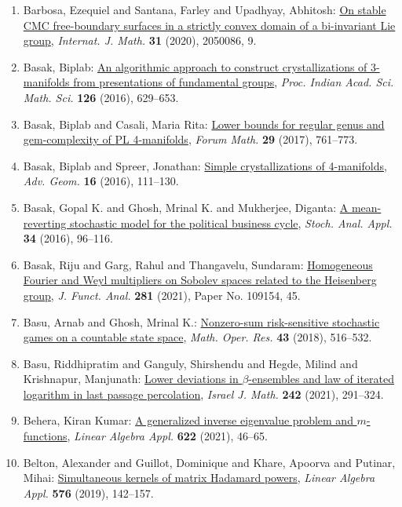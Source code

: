 \begin{enumerate}
\item Barbosa, Ezequiel and Santana, Farley and Upadhyay, Abhitosh: \href{https://doi.org/10.1142/S0129167X2050086X}{On stable {CMC} free-boundary surfaces in a strictly convex
domain of a bi-invariant {L}ie group}, \emph{Internat. J. Math.} {\bf 31} (2020), 2050086, 9.
\item Basak, Biplab: \href{https://doi.org/10.1007/s12044-016-0302-7}{An algorithmic approach to construct crystallizations of
3-manifolds from presentations of fundamental groups}, \emph{Proc. Indian Acad. Sci. Math. Sci.} {\bf 126} (2016), 629--653.
\item Basak, Biplab and Casali, Maria Rita: \href{https://doi.org/10.1515/forum-2015-0080}{Lower bounds for regular genus and gem-complexity of {PL}
4-manifolds}, \emph{Forum Math.} {\bf 29} (2017), 761--773.
\item Basak, Biplab and Spreer, Jonathan: \href{https://doi.org/10.1515/advgeom-2015-0043}{Simple crystallizations of 4-manifolds}, \emph{Adv. Geom.} {\bf 16} (2016), 111--130.
\item Basak, Gopal K. and Ghosh, Mrinal K. and Mukherjee, Diganta: \href{https://doi.org/10.1080/07362994.2015.1106321}{A mean-reverting stochastic model for the political business
cycle}, \emph{Stoch. Anal. Appl.} {\bf 34} (2016), 96--116.
\item Basak, Riju and Garg, Rahul and Thangavelu, Sundaram: \href{https://doi.org/10.1016/j.jfa.2021.109154}{Homogeneous {F}ourier and {W}eyl multipliers on {S}obolev
spaces related to the {H}eisenberg group}, \emph{J. Funct. Anal.} {\bf 281} (2021), Paper No. 109154, 45.
\item Basu, Arnab and Ghosh, Mrinal K.: \href{https://doi.org/10.1287/moor.2017.0870}{Nonzero-sum risk-sensitive stochastic games on a countable
state space}, \emph{Math. Oper. Res.} {\bf 43} (2018), 516--532.
\item Basu, Riddhipratim and Ganguly, Shirshendu and Hegde, Milind
and Krishnapur, Manjunath: \href{https://doi.org/10.1007/s11856-021-2135-z}{Lower deviations in {$\beta$}-ensembles and law of iterated
logarithm in last passage percolation}, \emph{Israel J. Math.} {\bf 242} (2021), 291--324.
\item Behera, Kiran Kumar: \href{https://doi.org/10.1016/j.laa.2021.03.025}{A generalized inverse eigenvalue problem and {$m$}-functions}, \emph{Linear Algebra Appl.} {\bf 622} (2021), 46--65.
\item Belton, Alexander and Guillot, Dominique and Khare, Apoorva
and Putinar, Mihai: \href{https://doi.org/10.1016/j.laa.2018.03.035}{Simultaneous kernels of matrix {H}adamard powers}, \emph{Linear Algebra Appl.} {\bf 576} (2019), 142--157.

\end{enumerate}
